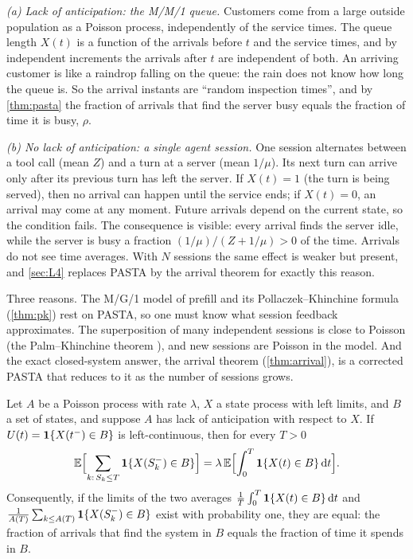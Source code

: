 \begin{example}\label{L1:ex:lookahead}
\emph{(a) Lack of anticipation: the M/M/1 queue.} Customers come from a large outside
population as a Poisson process, independently of the service times. The queue length
$X(t)$ is a function of the arrivals before $t$ and the service times, and by
independent increments the arrivals after $t$ are independent of both. An arriving
customer is like a raindrop falling on the queue: the rain does not know how long the
queue is. So the arrival instants are ``random inspection times'', and by
\cref{thm:pasta} the fraction of arrivals that find the server busy equals the fraction
of time it is busy, $\rho$.

\emph{(b) No lack of anticipation: a single agent session.} One session alternates
between a tool call (mean $Z$) and a turn at a server (mean $1/\mu$). Its
next turn can arrive only after its previous turn has left the server. If $X(t)=1$
(the turn is being served), then no arrival can happen until the service ends; if
$X(t)=0$, an arrival may come at any moment. Future arrivals depend on the current
state, so the condition fails. The consequence is visible: every arrival finds the
server idle, while the server is busy a fraction $(1/\mu)/(Z+1/\mu)>0$ of the time.
Arrivals do not see time averages. With $N$ sessions the same effect is weaker but
present, and \cref{sec:L4} replaces PASTA by the arrival theorem for exactly this
reason.
\end{example}

\begin{remark}\label{L1:rem:why-pasta}
Three reasons. The M/G/1 model of prefill and its Pollaczek--Khinchine formula
(\cref{thm:pk}) rest on PASTA, so one must know what session feedback approximates.
The superposition of many independent sessions is close to Poisson (the
Palm--Khinchine theorem \cite{khinchine1960}), and new sessions are Poisson in the
model. And the exact closed-system answer, the arrival theorem (\cref{thm:arrival}), is
a corrected PASTA that reduces to it as the number of sessions grows.
\end{remark}

\begin{theorem}\label{thm:pasta}
Let $A$ be a Poisson process with rate $\lambda$, $X$ a state process with left
limits, and $B$ a set of states, and suppose $A$ has lack of anticipation with respect
to $X$. If $U(t)=\mathbf{1}\{X(t^-)\in B\}$ is left-continuous, then for every $T>0$
\begin{equation}\label{L1:eq:pasta}
  \mathbb{E}\Bigl[\sum_{k:\,S_k\le T}\mathbf{1}\{X(S_k^-)\in B\}\Bigr]=\lambda\,\mathbb{E}\Bigl[\int_0^T\mathbf{1}\{X(t)\in B\}\,\mathrm{d} t\Bigr].
\end{equation}
Consequently, if the limits of the two averages
$\frac1T\int_0^T\mathbf{1}\{X(t)\in B\}\,\mathrm{d} t$ and
$\frac{1}{A(T)}\sum_{k\le A(T)}\mathbf{1}\{X(S_k^-)\in B\}$ exist with probability one, they
are equal: the fraction of arrivals that find the system in $B$ equals the fraction of
time it spends in $B$.
\end{theorem}

